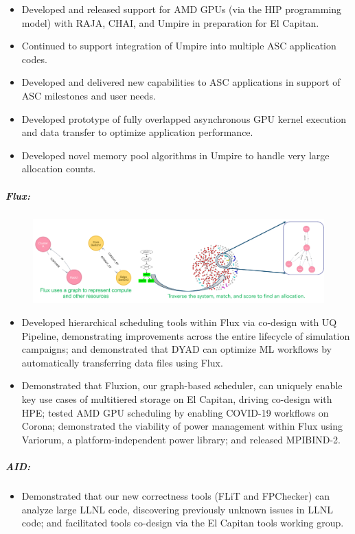\begin{itemize}
\item Developed and released support for AMD GPUs (via the HIP programming model) with RAJA, CHAI, and Umpire in preparation for El Capitan. 
\item Continued to support integration of Umpire into multiple ASC application codes.
\item Developed and delivered new capabilities to ASC applications in support of ASC milestones and user needs. 
\item Developed prototype of fully overlapped asynchronous GPU kernel execution and data transfer to optimize application performance.
\item Developed novel memory pool algorithms in Umpire to handle very large allocation counts.
\end{itemize}

\subparagraph{Flux:}
\begin{figure}[tb]
\centering
\includegraphics[width=\textwidth]{projects/2.3.6-NNSA/2.3.6.02-LLNL-ATDM/flux-resource-model.pdf}
\end{figure}

\begin{itemize}

\item Developed hierarchical scheduling tools within Flux via co-design with UQ Pipeline, demonstrating improvements across the entire lifecycle of simulation campaigns; and demonstrated that DYAD can optimize ML workflows by automatically transferring data files using Flux. 
\item Demonstrated that Fluxion, our graph-based scheduler, can uniquely enable key use cases of multitiered storage on El Capitan, driving co-design with HPE; tested AMD GPU scheduling by enabling COVID-19 workflows on Corona; demonstrated the viability of power management within Flux using Variorum, a platform-independent power library; and released MPIBIND-2. 


\end{itemize}

\subparagraph{AID:}
\begin{itemize}

\item Demonstrated that our new correctness tools (FLiT and FPChecker) can analyze large LLNL code, discovering previously unknown issues in LLNL code; and facilitated tools co-design via the El Capitan tools working group. 


\end{itemize}

